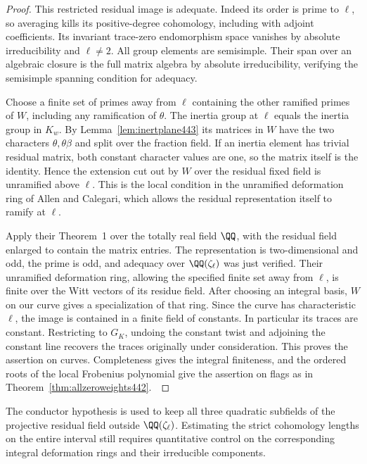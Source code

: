 \documentclass[a4paper,11pt]{article}
\theoremstyle{definition}
\theoremstyle{remark}
\numberwithin{equation}{section}
\begin{document}
\begin{proof}
This restricted residual image is adequate. Indeed its order
is prime to \(\ell\), so averaging kills its positive-degree
cohomology, including with adjoint coefficients. Its invariant
trace-zero endomorphism space vanishes by absolute irreducibility
and \(\ell\ne2\). All group elements are semisimple. Their span
over an algebraic closure is the full matrix algebra by absolute
irreducibility, verifying the semisimple spanning condition
for adequacy.

Choose a finite set of primes away from \(\ell\) containing the
other ramified primes of \(W\), including any ramification of
\(\theta\). The inertia group at \(\ell\) equals the inertia
group in \(K_w\). By Lemma~\ref{lem:inertplane443} its matrices
in \(W\) have the two characters \(\theta,\theta\beta\) and
split over the fraction field. If an inertia element has trivial
residual matrix, both constant character values are one, so the
matrix itself is the identity. Hence the extension cut out by
\(W\) over the residual fixed field is unramified above \(\ell\).
This is the local condition in the unramified deformation ring
of Allen and Calegari, which allows the residual representation
itself to ramify at \(\ell\).

Apply their Theorem~1 over the totally real field \(\QQ\), with
the residual field enlarged to contain the matrix entries. The
representation is two-dimensional and odd, the prime is odd,
and adequacy over \(\QQ(\zeta_\ell)\) was just verified. Their
unramified deformation ring, allowing the specified finite set
away from \(\ell\), is finite over the Witt vectors of its
residue field. After choosing an integral basis, \(W\) on our
curve gives a specialization of that ring. Since the curve has
characteristic \(\ell\), the image is contained in a finite field
of constants. In particular its traces are constant. Restricting
to \(G_K\), undoing the constant twist and adjoining the constant
line recovers the traces originally under consideration.
This proves the assertion on curves. Completeness gives the
integral finiteness, and the ordered roots of the local
Frobenius polynomial give the assertion on flags as in
Theorem~\ref{thm:allzeroweights442}.~\cite{XI-VIII-finiteunr443}
\end{proof}

The conductor hypothesis is used to keep all three quadratic
subfields of the projective residual field outside
\(\QQ(\zeta_\ell)\). Estimating the strict cohomology lengths
on the entire interval still requires quantitative control on
the corresponding integral deformation rings and their
irreducible components.
\end{document}
